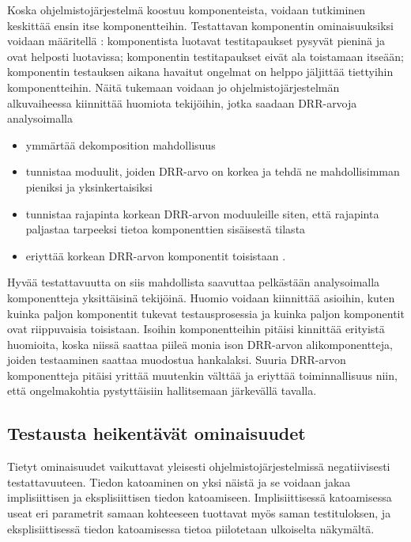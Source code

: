 \documentclass[finnish]{tktltiki2}
\numberwithin{table}{section}
\theoremstyle{definition}
\theoremstyle{remark}
\begin{document}

Koska ohjelmistojärjestelmä koostuu komponenteista, voidaan tutkiminen keskittää ensin itse komponentteihin. Testattavan komponentin ominaisuuksiksi voidaan määritellä \citep{Freedman:1991:TSC:126218.126229}: komponentista luotavat testitapaukset pysyvät pieninä ja ovat helposti luotavissa; komponentin testitapaukset eivät ala toistamaan itseään; komponentin testauksen aikana havaitut ongelmat on helppo jäljittää tiettyihin komponentteihin. Näitä tukemaan voidaan jo ohjelmistojärjestelmän alkuvaiheessa kiinnittää huomiota tekijöihin, jotka saadaan DRR-arvoja analysoimalla \citep{voas_improving_1992} 

\begin{itemize}
	\item ymmärtää dekomposition mahdollisuus
	\item tunnistaa moduulit, joiden DRR-arvo on korkea ja tehdä ne mahdollisimman pieniksi ja yksinkertaisiksi
	\item tunnistaa rajapinta korkean DRR-arvon moduuleille siten, että rajapinta paljastaa tarpeeksi tietoa komponenttien sisäisestä tilasta
	\item eriyttää korkean DRR-arvon komponentit toisistaan \citep[s. 23]{Voas:1995:STN:624607.625469}.
\end{itemize}


Hyvää testattavuutta on siis mahdollista saavuttaa pelkästään analysoimalla komponentteja yksittäisinä tekijöinä. Huomio voidaan kiinnittää asioihin, kuten kuinka paljon komponentit tukevat testausprosessia ja kuinka paljon komponentit ovat riippuvaisia toisistaan. Isoihin komponentteihin pitäisi kinnittää erityistä huomioita, koska niissä saattaa piileä monia ison DRR-arvon alikomponentteja, joiden testaaminen saattaa muodostua hankalaksi. Suuria DRR-arvon komponentteja pitäisi yrittää muutenkin välttää ja eriyttää toiminnallisuus niin, että ongelmakohtia pystyttäisiin hallitsemaan järkevällä tavalla.




\subsection{Testausta heikentävät ominaisuudet}

Tietyt ominaisuudet vaikuttavat yleisesti ohjelmistojärjestelmissä negatiivisesti testattavuuteen. Tiedon katoaminen on yksi näistä \citep{Voas:1995:STN:624607.625469} ja se voidaan jakaa implisiittisen ja eksplisiittisen tiedon katoamiseen. Implisiittisessä katoamisessa useat eri parametrit samaan kohteeseen tuottavat myös saman testituloksen, ja eksplisiittisessä tiedon katoamisessa tietoa piilotetaan ulkoiselta näkymältä. 
\end{document}
